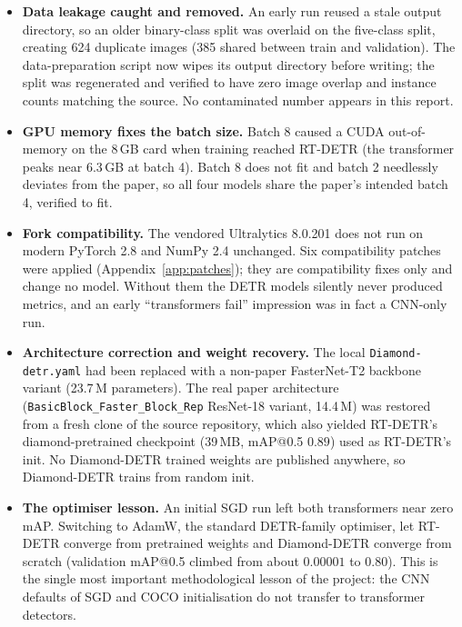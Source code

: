\documentclass[11pt,a4paper]{article}
\begin{document}
\begin{itemize}[leftmargin=1.5em,itemsep=3pt,topsep=2pt]
  \item \textbf{Data leakage caught and removed.} An early run reused a stale output directory, so
        an older binary-class split was overlaid on the five-class split, creating 624 duplicate
        images (385 shared between train and validation). The data-preparation script now wipes its
        output directory before writing; the split was regenerated and verified to have zero image
        overlap and instance counts matching the source. No contaminated number appears in this
        report.
  \item \textbf{GPU memory fixes the batch size.} Batch 8 caused a CUDA out-of-memory on the 8\,GB
        card when training reached RT-DETR (the transformer peaks near $6.3$\,GB at batch 4). Batch 8
        does not fit and batch 2 needlessly deviates from the paper, so all four models share the
        paper's intended batch 4, verified to fit.
  \item \textbf{Fork compatibility.} The vendored Ultralytics 8.0.201 does not run on modern PyTorch
        2.8 and NumPy 2.4 unchanged. Six compatibility patches were applied (Appendix~\ref{app:patches});
        they are compatibility fixes only and change no model. Without them the DETR models silently
        never produced metrics, and an early ``transformers fail'' impression was in fact a CNN-only
        run.
  \item \textbf{Architecture correction and weight recovery.} The local \texttt{Diamond-detr.yaml}
        had been replaced with a non-paper FasterNet-T2 backbone variant (23.7\,M parameters). The
        real paper architecture (\texttt{BasicBlock\_Faster\_Block\_Rep} ResNet-18 variant, 14.4\,M)
        was restored from a fresh clone of the source repository, which also yielded RT-DETR's
        diamond-pretrained checkpoint (39\,MB, mAP@0.5 $0.89$) used as RT-DETR's init. No
        Diamond-DETR trained weights are published anywhere, so Diamond-DETR trains from random init.
  \item \textbf{The optimiser lesson.} An initial SGD run left both transformers near zero mAP.
        Switching to AdamW, the standard DETR-family optimiser, let RT-DETR converge from pretrained
        weights and Diamond-DETR converge from scratch (validation mAP@0.5 climbed from about
        $0.00001$ to $0.80$). This is the single most important methodological lesson of the project:
        the CNN defaults of SGD and COCO initialisation do not transfer to transformer detectors.
\end{itemize}
\end{document}
